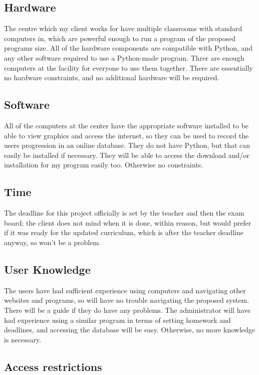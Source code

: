 \subsection{Hardware}

The centre which my client works for have multiple classrooms with standard computers in, which are powerful enough to run a program of the proposed programs size. All of the hardware components are compatible with Python, and any other software required to use a Python-made program. Threr are enough computers at the facility for everyone to use them together. There are essentially no hardware constraints, and no additional hardware will be required.

\subsection{Software}

All of the computers at the center have the appropriate software installed to be able to view graphics and access the internet, so they can be used to record the users progression in an online database. They do not have Python, but that can easily be installed if necessary. They will be able to access the download and/or installation for my program easily too. Otherwise no constraints.

\subsection{Time}

The deadline for this project officially is set by the teacher and then the exam board; the client does not mind when it is done, within reason, but would prefer if it was ready for the updated curriculum, which is after the teacher deadline anyway, so won't be a problem.

\subsection{User Knowledge}

The users have had sufficient experience using computers and navigating other websites and programs, so will have no trouble navigating the proposed system. There will be a guide if they do have any problems. The administrator will have had experience using a similar program in terms of setting homework and deadlines, and accessing the database will be easy. Otherwise, no more knowledge is necessary.

\subsection{Access restrictions}

